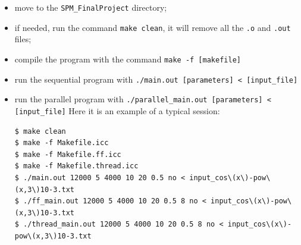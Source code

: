 \documentclass[10pt]{article}
\numberwithin{equation}{section}
\begin{document}
\begin{itemize}
\item move to the \verb|SPM_FinalProject| directory;
\item if needed, run the command \verb|make clean|, it will remove all the \verb|.o| and \verb|.out| files; 
\item compile the program with the command \verb|make -f [makefile]|
\item run the sequential program with \verb|./main.out [parameters] < [input_file]|
\item run the parallel program with \verb|./parallel_main.out [parameters] < [input_file]|
Here it is an example of a typical session:
\begin{verbatim}
$ make clean
$ make -f Makefile.icc
$ make -f Makefile.ff.icc
$ make -f Makefile.thread.icc
$ ./main.out 12000 5 4000 10 20 0.5 no < input_cos\(x\)-pow\(x,3\)10-3.txt
$ ./ff_main.out 12000 5 4000 10 20 0.5 8 no < input_cos\(x\)-pow\(x,3\)10-3.txt
$ ./thread_main.out 12000 5 4000 10 20 0.5 8 no < input_cos\(x\)-pow\(x,3\)10-3.txt
\end{verbatim}

\end{itemize}
\end{document}
